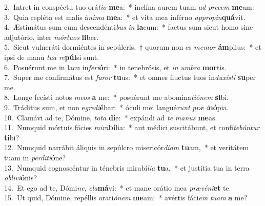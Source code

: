 {2.~}Intret in conspéctu tuo orá\textit{ti}\textit{o} \textbf{me}a:~* inclína aurem tuam \textit{ad} \textit{pre}\textit{cem} \textbf{me}am:\\
{3.~}Quia repléta est malis á\textit{ni}\textit{ma} \textbf{me}a:~* et vita mea inférno \textit{ap}\textit{pro}\textit{pin}\textbf{quá}vit.\\
{4.~}Æstimátus sum cum descendénti\textit{bus} \textit{in} \textbf{la}cum:~* factus sum sicut homo sine adjutório, inter \textit{mór}\textit{tu}\textit{os} \textbf{li}ber.\\
{5.~}Sicut vulneráti dormiéntes in sepúlcris,~† quorum non es \textit{me}\textit{mor} \textbf{ám}plius:~* et ipsi de manu \textit{tu}\textit{a} \textit{re}\textbf{púl}si sunt.\\
{6.~}Posuérunt me in lacu in\textit{fe}\textit{ri}\textbf{ó}ri:~* in tenebrósis, et \textit{in} \textit{um}\textit{bra} \textbf{mor}tis.\\
{7.~}Super me confirmátus est \textit{fu}\textit{ror} \textbf{tu}us:~* et omnes fluctus tuos in\textit{du}\textit{xí}\textit{sti} \textbf{su}per me.\\
{8.~}Longe fecísti notos \textit{me}\textit{os} \textbf{a} me:~* posuérunt me abomina\textit{ti}\textit{ó}\textit{nem} \textbf{si}bi.\\
{9.~}Tráditus sum, et non e\textit{gre}\textit{di}\textbf{é}bar:~* óculi mei langué\textit{runt} \textit{præ} \textit{i}\textbf{nó}pia.\\
{10.~}Clamávi ad te, Dómine, \textit{to}\textit{ta} \textbf{di}e:~* expándi ad \textit{te} \textit{ma}\textit{nus} \textbf{me}as.\\
{11.~}Numquid mórtuis fácies \textit{mi}\textit{ra}\textbf{bí}lia:~* aut médici suscitábunt, et confi\textit{te}\textit{bún}\textit{tur} \textbf{ti}bi?\\
{12.~}Numquid narrábit áliquis in sepúlcro misericór\textit{di}\textit{am} \textbf{tu}am,~* et veritátem tuam in \textit{per}\textit{di}\textit{ti}\textbf{ó}ne?\\
{13.~}Numquid cognoscéntur in ténebris mirabí\textit{li}\textit{a} \textbf{tu}a,~* et justítia tua in terra \textit{o}\textit{bli}\textit{vi}\textbf{ó}nis?\\
{14.~}Et ego ad te, Dómi\textit{ne}, \textit{cla}\textbf{má}vi:~* et mane orátio mea \textit{præ}\textit{vé}\textit{ni}\textbf{et} te.\\
{15.~}Ut quid, Dómine, repéllis orati\textit{ó}\textit{nem} \textbf{me}am:~* avértis fáci\textit{em} \textit{tu}\textit{am} \textbf{a} me?\\
